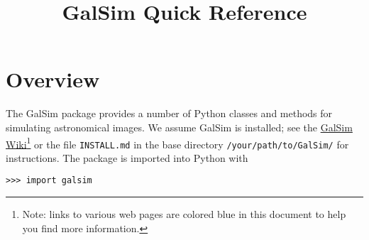 \documentclass[preprint,11pt]{../../devel/modules/aastex}
\begin{document}
\setlength{\parskip}{2.0ex plus 0.5ex minus 0.5ex}
\setlength{\parindent}{0cm}

\title{GalSim Quick Reference}

\tableofcontents

\newpage

\section{Overview}


The GalSim package provides a number of Python classes and methods for
simulating astronomical images.  We assume GalSim is installed; see the
\href{https://github.com/GalSim-developers/GalSim/wiki}{GalSim
    Wiki}\footnote{Note: links to various web pages are colored blue in this document to help you find more information.} or the file \texttt{INSTALL.md} in the base directory \texttt{/your/path/to/GalSim/}
for instructions.  The package is imported into Python with

\texttt{>>> import galsim}
\end{document}

